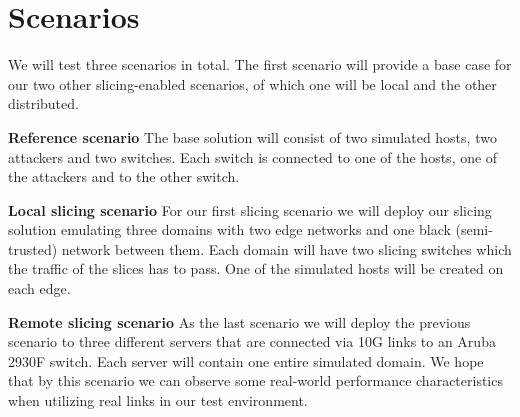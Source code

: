\section{Scenarios}
\label{scenarios}
We will test three scenarios in total. The first scenario will provide a base case for our two other slicing-enabled scenarios, of which one will be local and the other distributed.

\begin{description}[style=multiline, labelwidth=0.7cm]
    \item[\namedlabel{S1}{S1}] \textbf{Reference scenario} The base solution will consist of two simulated hosts, two attackers and two switches. Each switch is connected to one of the hosts, one of the attackers and to the other switch.
    \item[\namedlabel{S2}{S2}] \textbf{Local slicing scenario} For our first slicing scenario we will deploy our slicing solution emulating three domains with two edge networks and one black (semi-trusted) network between them. Each domain will have two slicing switches which the traffic of the slices has to pass. One of the simulated hosts will be created on each edge.
    \item[\namedlabel{S3}{S3}] \textbf{Remote slicing scenario} As the last scenario we will deploy the previous scenario to three different servers that are connected via 10G links to an Aruba 2930F switch. Each server will contain one entire simulated domain. We hope that by this scenario we can observe some real-world performance characteristics when utilizing real links in our test environment.
\end{description}



